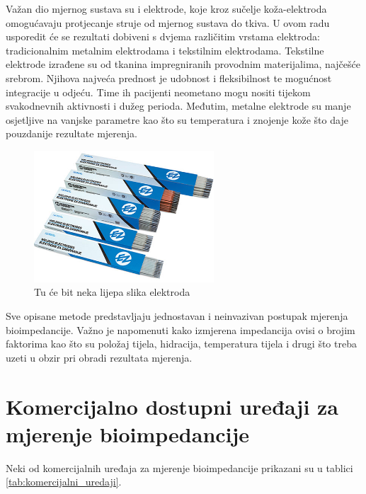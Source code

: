 \documentclass[../diplomski_rad.tex]{subfiles}
\begin{document}
Važan dio mjernog sustava su i elektrode, koje kroz sučelje koža-elektroda omogućavaju protjecanje struje od mjernog sustava do tkiva. 
U ovom radu usporedit će se rezultati dobiveni s dvjema različitim vrstama elektroda: tradicionalnim metalnim elektrodama i tekstilnim elektrodama. 
Tekstilne elektrode izrađene su od tkanina impregniranih provodnim materijalima, najčešće srebrom. 
Njihova najveća prednost je udobnost i fleksibilnost te mogućnost integracije u odjeću.
Time ih pacijenti neometano mogu nositi tijekom svakodnevnih aktivnosti i dužeg perioda. 
Međutim, metalne elektrode su manje osjetljive na vanjske parametre kao što su temperatura i znojenje kože što daje pouzdanije rezultate mjerenja. 
\cite{Meding2021}

\begin{figure}[htb]
    \centering
    \includegraphics[width=0.6\textwidth]{Figures/electrode.jpg} 
    \caption{Tu će bit neka lijepa slika elektroda}
    \label{slk:elektrode}
\end{figure}

Sve opisane metode predstavljaju jednostavan i neinvazivan postupak mjerenja bioimpedancije. 
Važno je napomenuti kako izmjerena impedancija ovisi o brojim faktorima kao što su položaj tijela, hidracija, temperatura tijela i drugi 
što treba uzeti u obzir pri obradi rezultata mjerenja.

\section{Komercijalno dostupni uređaji za mjerenje bioimpedancije}

Neki od komercijalnih uređaja za mjerenje bioimpedancije prikazani su u tablici \ref{tab:komercijalni_uredaji}.
\end{document}
